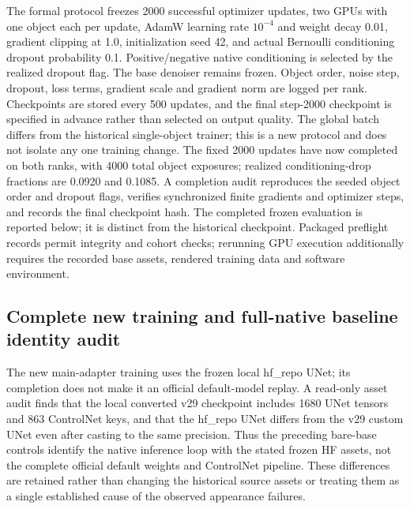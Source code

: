 \documentclass[11pt]{article}
\begin{document}
The formal protocol freezes 2000 successful optimizer updates, two GPUs with one object each per update, AdamW learning rate $10^{-4}$ and weight decay 0.01, gradient clipping at 1.0, initialization seed 42, and actual Bernoulli conditioning dropout probability 0.1. Positive/negative native conditioning is selected by the realized dropout flag. The base denoiser remains frozen. Object order, noise step, dropout, loss terms, gradient scale and gradient norm are logged per rank. Checkpoints are stored every 500 updates, and the final step-2000 checkpoint is specified in advance rather than selected on output quality. The global batch differs from the historical single-object trainer; this is a new protocol and does not isolate any one training change. The fixed 2000 updates have now completed on both ranks, with 4000 total object exposures; realized conditioning-drop fractions are 0.0920 and 0.1085. A completion audit reproduces the seeded object order and dropout flags, verifies synchronized finite gradients and optimizer steps, and records the final checkpoint hash. The completed frozen evaluation is reported below; it is distinct from the historical checkpoint. Packaged preflight records permit integrity and cohort checks; rerunning GPU execution additionally requires the recorded base assets, rendered training data and software environment.

\subsection*{Complete new training and full-native baseline identity audit}
The new main-adapter training uses the frozen local hf\_repo UNet; its completion does not make it an official default-model replay. A read-only asset audit finds that the local converted v29 checkpoint includes 1680 UNet tensors and 863 ControlNet keys, and that the hf\_repo UNet differs from the v29 custom UNet even after casting to the same precision. Thus the preceding bare-base controls identify the native inference loop with the stated frozen HF assets, not the complete official default weights and ControlNet pipeline. These differences are retained rather than changing the historical source assets or treating them as a single established cause of the observed appearance failures.
\end{document}
